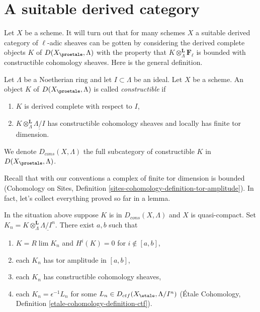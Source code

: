 \section{A suitable derived category}
\label{section-suitable-derived}

\noindent
Let $X$ be a scheme. It will turn out that for many schemes $X$ a suitable
derived category of $\ell$-adic sheaves can be gotten by considering the
derived complete objects $K$ of $D(X_\proetale, \Lambda)$ with the property
that $K \otimes_\Lambda^\mathbf{L} \mathbf{F}_\ell$ is bounded with
constructible cohomology sheaves. Here is the general definition.

\begin{definition}
\label{definition-Dbc}
Let $\Lambda$ be a Noetherian ring and let $I \subset \Lambda$ be an ideal.
Let $X$ be a scheme. An object $K$ of $D(X_\proetale, \Lambda)$ is called
{\it constructible} if
\begin{enumerate}
\item $K$ is derived complete with respect to $I$,
\item $K \otimes_\Lambda^\mathbf{L} \underline{\Lambda/I}$
has constructible cohomology sheaves and locally has finite tor dimension.
\end{enumerate}
We denote $D_{cons}(X, \Lambda)$ the full subcategory of constructible
$K$ in $D(X_\proetale, \Lambda)$.
\end{definition}

\noindent
Recall that with our conventions a complex of finite tor dimension
is bounded (Cohomology on Sites, Definition
\ref{sites-cohomology-definition-tor-amplitude}).
In fact, let's collect everything proved so far in a lemma.

\begin{lemma}
\label{lemma-describe-constructible-complexes}
In the situation above suppose $K$ is in $D_{cons}(X, \Lambda)$
and $X$ is quasi-compact. Set
$K_n = K \otimes_\Lambda^\mathbf{L} \underline{\Lambda/I^n}$.
There exist $a, b$ such that
\begin{enumerate}
\item $K = R\lim K_n$ and $H^i(K) = 0$ for $i \not \in [a, b]$,
\item each $K_n$ has tor amplitude in $[a, b]$,
\item each $K_n$ has constructible cohomology sheaves,
\item each $K_n = \epsilon^{-1}L_n$ for some
$L_n \in D_{ctf}(X_\etale, \Lambda/I^n)$
(\'Etale Cohomology, Definition \ref{etale-cohomology-definition-ctf}).
\end{enumerate}
\end{lemma}

